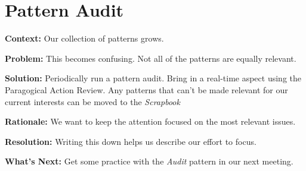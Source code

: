 \section{Pattern Audit}

\textbf{Context:} Our collection of patterns grows.

\textbf{Problem:} This becomes confusing.  Not all of the patterns are equally relevant.

\textbf{Solution:} Periodically run a pattern audit.  Bring in a real-time aspect using the Paragogical Action Review.  Any patterns that can't be made relevant for our current interests can be moved to the \emph{Scrapbook}

\textbf{Rationale:} We want to keep the attention focused on the most relevant issues.

\textbf{Resolution:} Writing this down helps us describe our effort to focus.

\textbf{What's Next:} Get some practice with the \emph{Audit} pattern in our next meeting.